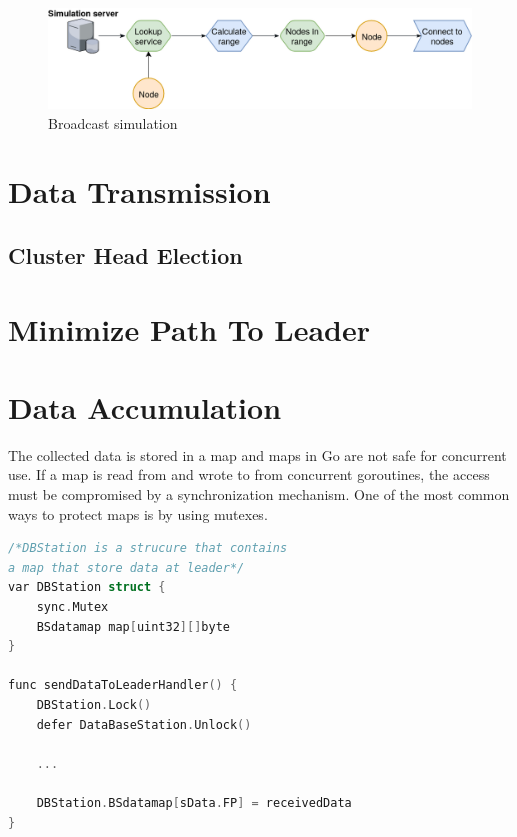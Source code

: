 \documentclass[USenglish]{uit-thesis}
\begin{document}
\begin{figure}
\centering
\includegraphics[width=\textwidth]{broadcast_simulation.png}
\caption{Broadcast simulation}
\label{fig:broadcast_simulation}
\end{figure}

\section{Data Transmission}
\subsection{Cluster Head Election}

\section{Minimize Path To Leader}

\section{Data Accumulation}



The collected data is stored in a map and maps in Go are not safe for concurrent use. If a map is read from and wrote to from concurrent goroutines, the access must be compromised by a synchronization mechanism. One of the most common ways to protect maps is by using mutexes.
\begin{lstlisting}[frame=single,caption={Small Go program showing how mutexes are used when updating a map},language=C]
/*DBStation is a strucure that contains 
a map that store data at leader*/
var DBStation struct {
	sync.Mutex
	BSdatamap map[uint32][]byte
}

func sendDataToLeaderHandler() {
	DBStation.Lock()
	defer DataBaseStation.Unlock()
	
	...
	
	DBStation.BSdatamap[sData.FP] = receivedData
}
\end{lstlisting}
\end{document}
